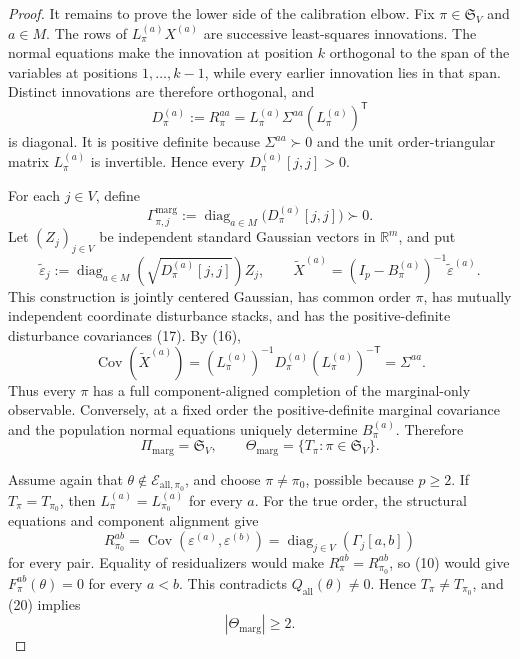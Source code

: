 \documentclass{article}
\begin{document}
\begin{proof}
It remains to prove the lower side of the calibration elbow.  Fix \(\pi\in\mathfrak S_V\) and \(a\in M\).  The rows of \(L_\pi^{(a)}X^{(a)}\) are successive least-squares innovations.  The normal equations make the innovation at position \(k\) orthogonal to the span of the variables at positions \(1,\ldots,k-1\), while every earlier innovation lies in that span.  Distinct innovations are therefore orthogonal, and
\[
D_\pi^{(a)}:=R_\pi^{aa}
=L_\pi^{(a)}\Sigma^{aa}(L_\pi^{(a)})^{\mathsf T}
\tag{16}
\]
is diagonal.  It is positive definite because \(\Sigma^{aa}\succ0\) and the unit order-triangular matrix \(L_\pi^{(a)}\) is invertible.  Hence every \(D_\pi^{(a)}[j,j]>0\).

For each \(j\in V\), define
\[
\Gamma_{\pi,j}^{\mathrm{marg}}
:=\operatorname{diag}_{a\in M}\bigl(D_\pi^{(a)}[j,j]\bigr)\succ0.
\tag{17}
\]
Let \((Z_j)_{j\in V}\) be independent standard Gaussian vectors in \(\mathbb R^m\), and put
\[
\widetilde\varepsilon_j
:=\operatorname{diag}_{a\in M}\!\left(\sqrt{D_\pi^{(a)}[j,j]}\right)Z_j,
\qquad
\widetilde X^{(a)}=(I_p-B_\pi^{(a)})^{-1}\widetilde\varepsilon^{(a)}.
\tag{18}
\]
This construction is jointly centered Gaussian, has common order \(\pi\), has mutually independent coordinate disturbance stacks, and has the positive-definite disturbance covariances (17).  By (16),
\[
\operatorname{Cov}(\widetilde X^{(a)})
=(L_\pi^{(a)})^{-1}D_\pi^{(a)}(L_\pi^{(a)})^{-\mathsf T}
=\Sigma^{aa}.
\tag{19}
\]
Thus every \(\pi\) has a full component-aligned completion of the marginal-only observable.  Conversely, at a fixed order the positive-definite marginal covariance and the population normal equations uniquely determine \(B_\pi^{(a)}\).  Therefore
\[
\Pi_{\mathrm{marg}}=\mathfrak S_V,
\qquad
\Theta_{\mathrm{marg}}=\{T_\pi:\pi\in\mathfrak S_V\}.
\tag{20}
\]

Assume again that \(\theta\notin\mathcal E_{\mathrm{all},\pi_0}\), and choose \(\pi\ne\pi_0\), possible because \(p\ge2\).  If \(T_\pi=T_{\pi_0}\), then \(L_\pi^{(a)}=L_{\pi_0}^{(a)}\) for every \(a\).  For the true order, the structural equations and component alignment give
\[
R_{\pi_0}^{ab}
=\operatorname{Cov}(\varepsilon^{(a)},\varepsilon^{(b)})
=\operatorname{diag}_{j\in V}(\Gamma_j[a,b])
\tag{21}
\]
for every pair.  Equality of residualizers would make \(R_\pi^{ab}=R_{\pi_0}^{ab}\), so (10) would give \(F_\pi^{ab}(\theta)=0\) for every \(a<b\).  This contradicts \(Q_{\mathrm{all}}(\theta)\ne0\).  Hence \(T_\pi\ne T_{\pi_0}\), and (20) implies
\[
|\Theta_{\mathrm{marg}}|\ge2.
\tag{22}
\]


\end{proof}
\end{document}
